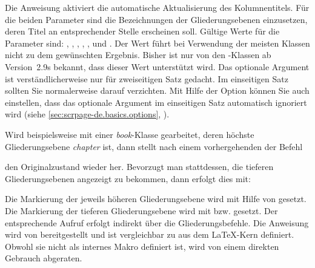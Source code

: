 \begin{Declaration}
\end{Declaration}%
Die Anweisung  aktiviert die automatische Aktualisierung des
Kolumnentitels.  Für die beiden Parameter sind die Bezeichnungen der
Gliederungsebenen einzusetzen, deren Titel an
entsprechender Stelle erscheinen soll. Gültige Werte für die Parameter sind:
, ,
, , ,
 und . Der Wert  führt bei
Verwendung der meisten Klassen nicht zu dem gewünschten Ergebnis. Bisher ist
nur von den \KOMAScript-Klassen ab Version~2.9s bekannt, dass dieser Wert
unterstützt wird.  Das optionale Argument  ist
ver\-ständlicherweise nur für zweiseitigen Satz gedacht. Im einseitigen Satz
sollten Sie normalerweise darauf verzichten. Mit Hilfe der Option
können Sie auch einstellen, dass das optionale Argument im
einseitigen Satz automatisch ignoriert wird (siehe
\autoref{sec:scrpage-de.basics.options},
).
\begin{Example}
  Wird beispielsweise mit einer \emph{book}-Klasse gearbeitet, deren höch\-ste
  Gliederungsebene \emph{chapter} ist, dann stellt nach einem vorhergehenden
   der Befehl
\begin{lstcode}
\end{lstcode}
  den Originalzustand wieder her. Bevorzugt man stattdessen, die tieferen
  Gliederungsebenen angezeigt zu bekommen, dann erfolgt dies mit:
\begin{lstcode}
\end{lstcode}
\end{Example}

\begin{Explain}
  Die Markierung der jeweils höheren Gliederungsebene wird mit Hilfe von
   gesetzt. Die Markierung der
  tieferen Gliederungsebene wird mit 
  bzw.   gesetzt.  Der entsprechende Aufruf
  erfolgt indirekt über die Gliederungsbefehle. Die Anweisung 
  wird von  bereitgestellt und ist vergleichbar zu
   aus dem \LaTeX-Kern
  definiert. Obwohl sie nicht als internes Makro definiert ist, wird von einem
  direkten Gebrauch abgeraten.
\end{Explain}
\EndIndexGroup
\EndIndexGroup


